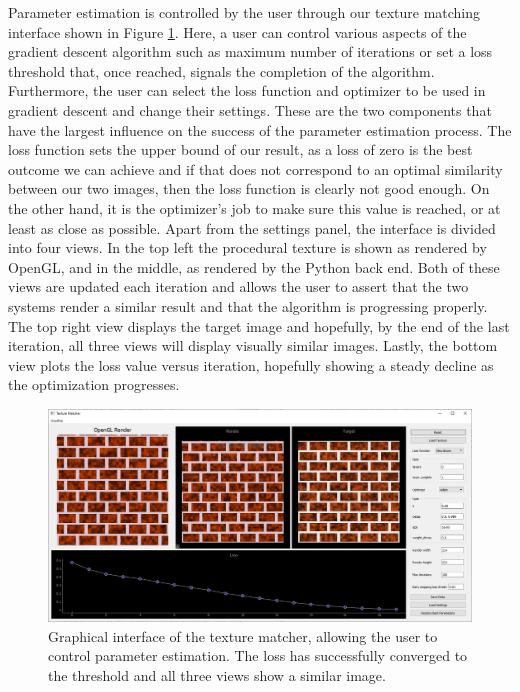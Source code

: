 Parameter estimation is controlled by the user through our texture matching interface shown in Figure \ref{fig:TextureMatcherInterface}. Here, a user can control various aspects of the gradient descent algorithm such as maximum number of iterations or set a loss threshold that, once reached, signals the completion of the algorithm. Furthermore, the user can select the loss function and optimizer to be used in gradient descent and change their settings. These are the two components that have the largest influence on the success of the parameter estimation process. The loss function sets the upper bound of our result, as a loss of zero is the best outcome we can achieve and if that does not correspond to an optimal similarity between our two images, then the loss function is clearly not good enough. On the other hand, it is the optimizer's job to make sure this value is reached, or at least as close as possible. Apart from the settings panel, the interface is divided into four views. In the top left the procedural texture is shown as rendered by OpenGL, and in the middle, as rendered by the Python back end. Both of these views are updated each iteration and allows the user to assert that the two systems render a similar result and that the algorithm is progressing properly. The top right view displays the target image and hopefully, by the end of the last iteration, all three views will display visually similar images. Lastly, the bottom view plots the loss value versus iteration, hopefully showing a steady decline as the optimization progresses.


\begin{figure}[!h]
    \centering
    \includegraphics[width=.9\textwidth]{img/method/Texture Matcher.JPG}
    \caption{Graphical interface of the texture matcher, allowing the user to control parameter estimation. The loss has successfully converged to the threshold and all three views show a similar image.}
    \label{fig:TextureMatcherInterface}
\end{figure}

